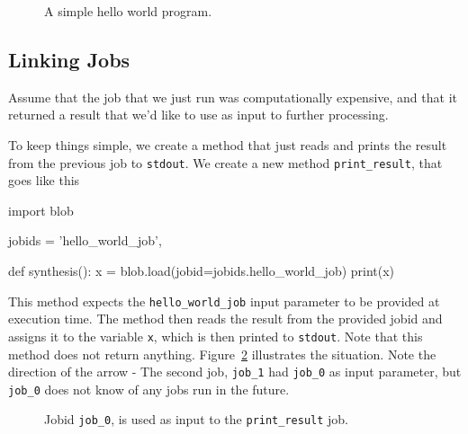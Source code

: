 \documentclass[a4paper]{article}
\begin{document}
\begin{figure}[h!]
  \begin{center}
    
    \caption{A simple hello world program.}
    \label{fig:execflow-hello-world}
  \end{center}
\end{figure}

\clearpage





\subsection{Linking Jobs}
Assume that the job that we just run was computationally expensive,
and that it returned a result that we'd like to use as input to further
processing.

To keep things simple, we create a method that just reads and prints
the result from the previous job to \texttt{stdout}.  We create a new
method \texttt{print\_result}, that goes like this

\begin{python}
import blob
  
jobids = {'hello_world_job',}

def synthesis():
    x = blob.load(jobid=jobids.hello_world_job)
    print(x)
\end{python}

This method expects the \texttt{hello\_world\_job} input parameter to
be provided at execution time.  The method then reads the result from
the provided jobid and assigns it to the variable \texttt{x}, which is
then printed to \texttt{stdout}.  Note that this method does not
return anything.  Figure~\ref{fig:execflow-print-result} illustrates
the situation.  Note the direction of the arrow - The second job,
\texttt{job\_1} had \texttt{job\_0} as input parameter, but
\texttt{job\_0} does not know of any jobs run in the future.

\begin{figure}[h!]
  \begin{center}
    
    \caption{Jobid \texttt{job\_0}, is used as input to the
      \texttt{print\_result} job.}
    \label{fig:execflow-print-result}
  \end{center}
\end{figure}



\clearpage
\end{document}
